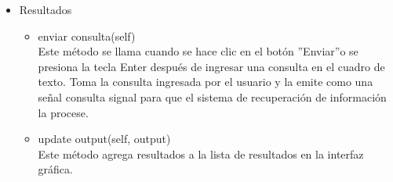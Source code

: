 \begin{itemize}
\begin{itemize}
  \end{itemize}
  \item Resultados
  \begin{itemize}
    \item enviar consulta(self) \\ Este método se llama cuando se hace clic en el botón ”Enviar”o se presiona la tecla Enter después de ingresar una consulta en el cuadro de texto. Toma la consulta ingresada por el usuario y la emite como una señal consulta signal para que el sistema de recuperación de información la procese.
    \item update output(self, output) \\ Este método agrega resultados a la lista de resultados en la interfaz gráfica.
  \end{itemize}
\end{itemize}